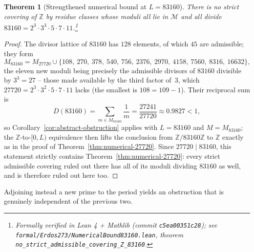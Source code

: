 \documentclass[11pt,a4paper]{article}
\theoremstyle{plain}
\newtheorem{theorem}{Theorem}
\theoremstyle{definition}
\theoremstyle{remark}
\begin{document}
\begin{theorem}[{Strengthened numerical bound at $L = 83160$}]
\label{thm:numerical-83160}
There is no strict covering of\/ $\mathbb{Z}$ by residue classes
whose moduli all lie in $\mathcal{M}$ and all divide $83160 = 2^3
\cdot 3^3 \cdot 5 \cdot 7 \cdot 11$.\footnote{Formally verified in
Lean 4 + Mathlib (commit \texttt{c5ea00351c28}); see
\texttt{formal/Erdos273/NumericalBound83160.lean}, theorem
\texttt{no\_strict\_admissible\_covering\_Z\_83160}.}
\end{theorem}
\begin{proof}
The divisor lattice of $83160$ has $128$ elements, of which $45$ are
admissible; they form
\[
  M_{83160} = M_{27720} \cup \{108,\ 270,\ 378,\ 540,\ 756,\ 2376,\
  2970,\ 4158,\ 7560,\ 8316,\ 16632\},
\]
the eleven new moduli being precisely the admissible divisors of
$83160$ divisible by $3^3 = 27$ -- those made available by the third
factor of~$3$, which $27720 = 2^3 \cdot 3^2 \cdot 5 \cdot 7 \cdot 11$
lacks (the smallest is $108 = 109 - 1$). Their reciprocal sum is
\[
  D(83160) = \sum_{m \in M_{83160}} \frac{1}{m} = \frac{27241}{27720}
  \approx 0.9827 < 1,
\]
so Corollary~\ref{cor:abstract-obstruction} applies with $L = 83160$
and $M = M_{83160}$; the $\mathbb{Z}$-to-$[0, L)$ equivalence then
lifts the conclusion from $\mathbb{Z}/83160\mathbb{Z}$ to $\mathbb{Z}$
exactly as in the proof of Theorem~\ref{thm:numerical-27720}. Since
$27720 \mid 83160$, this statement strictly contains
Theorem~\ref{thm:numerical-27720}: every strict admissible covering
ruled out there has all of its moduli dividing $83160$ as well, and
is therefore ruled out here too.
\end{proof}

Adjoining instead a new prime to the period yields an obstruction
that is genuinely independent of the previous two.
\end{document}
